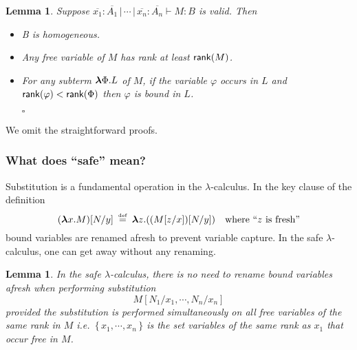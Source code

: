 \documentclass{article}
\newcommand{\makeset}[1]{\{\,{#1}\,\}}
\newcommand   \myendproof{{%
           \parfillskip=0pt            %
           \widowpenalty=10000         %
               \displaywidowpenalty=10000  %
               \finalhyphendemerits=0      %
        \leavevmode                 %
           \unskip                     %
          \nobreak                    %
                \hfil                       %
        \penalty50                  %
        \hskip2pt                   %
        \null                       %
        \hfill                      %
         $\square$                   %
        \par                        %
        \penalty-200                %
        \smallskip                  %
          }
         }
\newcommand\seq[2]{{{#1} \vdash {#2}}}
\newcommand\blambda{\hbox{\boldmath $\lambda$}}
\newcommand\lterm[2]{{\blambda{#1}.{#2}}}
\newcommand\defined{\mathbin{{\buildrel{\rm \scriptscriptstyle
                   def}\over{=}}}}
\newtheorem{lemma}[theorem]{Lemma}
\theoremstyle{definition}
\theoremstyle{remark}
\newcommand\rank[1]{{\sf rank}(#1)}
\begin{document}
\begin{lemma}\label{lem:safe}
Suppose $\seq{\overline{x_1} : \overline{A_1}\, | \, \cdots\, | \,
\overline{x_n} : \overline{A_n}}{M : B}$ is valid. Then
\begin{itemize}
\item[(i)] B is homogeneous.
\item[(ii)] Any free variable of $M$ has rank
at least $\rank{M}$.
\item[(iii)] For any subterm $\lterm{\Phi}{L}$
of $M$, if the variable $\varphi$ occurs in $L$ and $\rank{\varphi}
< \rank{\Phi}$ then $\varphi$ is bound in $L$. \myendproof
\end{itemize}
\end{lemma}

We omit the straightforward proofs.

\subsubsection*{What does ``safe'' mean?}

Substitution is a fundamental operation in the $\lambda$-calculus.
In the key clause of the definition
\[ (\lterm{x}{M})[N / y] \; \defined \; \lterm{z}{((M[z / x]) [N / y])} \quad
\hbox{where ``$z$ is fresh''}\] bound variables are renamed afresh
to prevent variable capture. In the {safe $\lambda$-calculus}, one
can get away without any renaming.

\begin{lemma}In the safe $\lambda$-calculus, there is no need to
rename bound variables afresh when performing substitution
\[M[N_1 / x_1 , \cdots, N_n / x_n]\]
provided the substitution is performed simultaneously on \emph{all}
free variables of the same rank in $M$ i.e.~$\makeset{x_1, \cdots,
x_n}$ is the set variables of the same rank as $x_1$ that occur free
in $M$.
\end{lemma}
\end{document}

